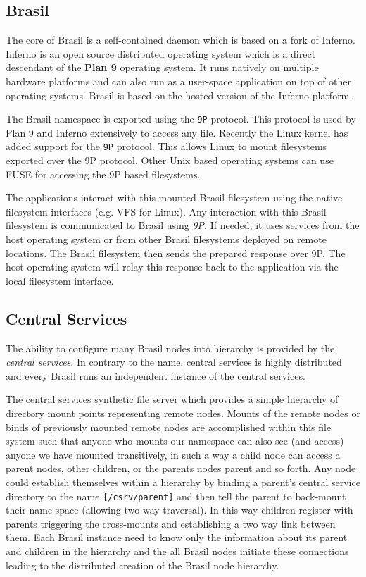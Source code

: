 \subsection{Brasil}

The core of Brasil is a self-contained daemon which is based on a fork of
Inferno.
Inferno\cite{inferno} is an open source distributed operating system 
which is a direct descendant of the \textbf{Plan 9} operating system.  
It runs natively on
multiple hardware platforms and can also run as a user-space application on
top of other operating systems.
Brasil is based on the hosted version of the Inferno platform.

The Brasil namespace is exported using the \texttt{9P} protocol. 
This protocol is used by Plan 9 and Inferno extensively to access any file. 
Recently the Linux kernel has added support for the \texttt{9P}
protocol\cite{graverobbers}.  This allows Linux to mount filesystems
exported over the 9P protocol.  Other Unix based operating systems can use
FUSE\cite{FUSE} for accessing the 9P based filesystems. 

The applications interact with this mounted Brasil filesystem using the native
filesystem interfaces (e.g. VFS for Linux). Any interaction with this Brasil
filesystem is communicated to Brasil using \textit{9P}. 
If needed, it uses services from the host operating system or from other Brasil
filesystems deployed on remote locations.  The Brasil filesystem then sends the
prepared response over 9P. The host operating system will relay this response
back to the application via the local filesystem interface.

\subsection{Central Services}

The ability to configure many Brasil nodes into hierarchy is provided by the
\textit{central services}.  In contrary to the name, central services is
highly distributed and every Brasil runs an independent instance of the central
services.  

The central services synthetic file server which provides a simple hierarchy of
directory mount points representing remote nodes.  Mounts of the remote nodes
or binds of previously mounted remote nodes are accomplished within this file
system such that anyone who mounts our namespace can also see (and
access) anyone we have mounted transitively,  in such a way a child
node can access a parent nodes, other children, or the parents nodes
parent and so forth. Any node could establish themselves within a
hierarchy by binding a parent's central service directory to the name
\texttt{[/csrv/parent]} and then tell the parent to back-mount their name space
(allowing two way traversal).  In this way children register with parents
triggering the cross-mounts and establishing a two way link between them. Each
Brasil instance need to know only the information about its parent and children
in the hierarchy and the all Brasil nodes initiate these connections leading to
the distributed creation of the Brasil node hierarchy.
 
